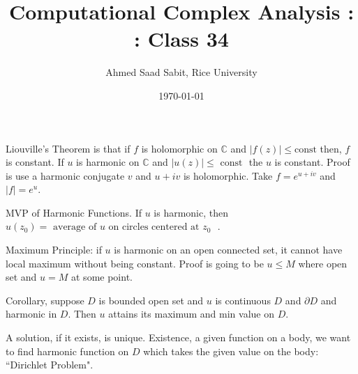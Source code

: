 \documentclass[letter]{article}
\title{Computational Complex Analysis : : Class 34}
\author{Ahmed Saad Sabit, Rice University}
\date{\today}
\begin{document}
\maketitle
Liouville's Theorem  is that if $f$ is holomorphic on $\mathbb{C}$ and $|f(z)| \le \text{const}$ then, $f$ is constant. If $u$ is harmonic on $\mathbb{C}$ and $|u(z)| \le  \text{ const } $ the $u$ is constant. Proof is use a harmonic conjugate $v$ and $u+iv$ is holomorphic. Take $f = e^{u + iv}$ and $|f| = e ^{u}$. 

MVP of Harmonic Functions. If $u$ is harmonic, then $u(z_0) = \text{ average of $u$ on circles centered at $z_0$ }$. 

Maximum Principle: if $u$ is harmonic on an open connected set, it cannot have local maximum without being constant. Proof is going to be $u \le M$ where open set and $u = M$ at some point.

Corollary, suppose $D$ is bounded open set and $u$ is continuous $D$ and $\partial D$ and harmonic in $D$. Then $u$ attains its maximum and min value on $D$. 

A solution, if it exists, is unique. Existence, a given function on a body, we want to find harmonic function on $D$ which takes the given value on the body: ``Dirichlet Problem". 
\end{document}
